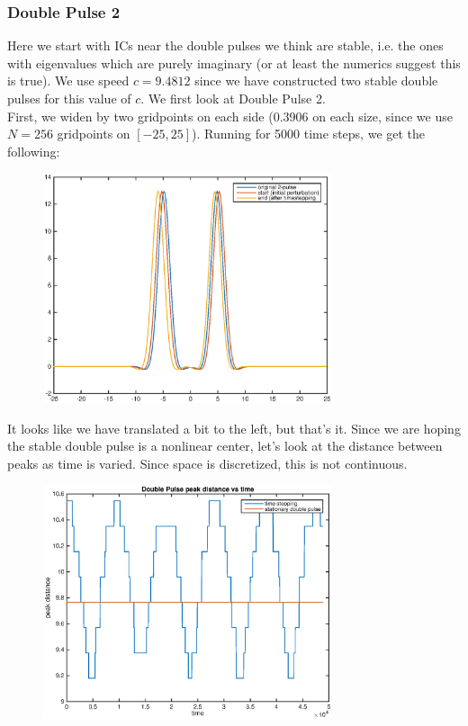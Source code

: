 \documentclass[12pt]{article}
\begin{document}
\subsubsection*{Double Pulse 2}
Here we start with ICs near the double pulses we think are stable, i.e. the ones with eigenvalues which are purely imaginary (or at least the numerics suggest this is true). We use speed $c = 9.4812$ since we have constructed two stable double pulses for this value of $c$. We first look at Double Pulse 2.\\

First, we widen by two gridpoints on each side (0.3906 on each size, since we use $N = 256$ gridpoints on $[-25, 25]$). Running for 5000 time steps, we get the following:

\begin{figure}[H]
	\includegraphics[width=8.5cm]{2double1a_t5000.eps}
\end{figure}

It looks like we have translated a bit to the left, but that's it. Since we are hoping the stable double pulse is a nonlinear center, let's look at the distance between peaks as time is varied. Since space is discretized, this is not continuous.

\begin{figure}[H]
	\includegraphics[width=8.5cm]{2double1a_osc1.eps}
\end{figure}
\end{document}
